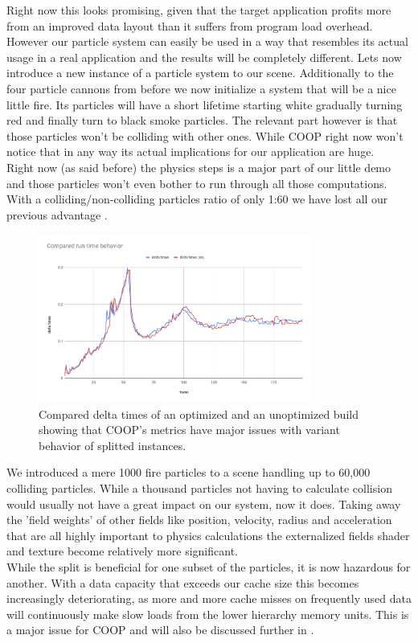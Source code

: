 Right now this looks promising, given that the target application profits more from an improved data layout than it suffers from program load overhead. However our particle system can easily be used in a way that resembles its actual usage in a real application and the results will be completely different. Lets now introduce a new instance of a particle system to our scene. Additionally to the four particle cannons from before we now initialize a system that will be a nice little fire. Its particles will have a short lifetime starting white gradually turning red and finally turn to black smoke particles. The relevant part however is that those particles won't be colliding with other ones. While COOP right now won't notice that in any way its actual implications for our application are huge.\\
Right now (as said before) the physics steps is a major part of our little demo and those particles won't even bother to run through all those computations. With a colliding/non-colliding particles ratio of only 1:60 we have lost all our previous advantage .
\begin{figure}[!htbp]
	\centering
	\includegraphics[width=0.8\textwidth,height=0.6\textwidth]{PICs/delta_times_fire}
	\caption{Compared delta times of an optimized and an unoptimized build showing that COOP's metrics have major issues with variant behavior of splitted instances.}
	\label{delta_times_fire}
\end{figure}
We introduced a mere 1000 fire particles to a scene handling up to 60,000 colliding particles. While a thousand particles not having to calculate collision would usually not have a great impact on our system, now it does. Taking away the 'field weights' of other fields like position, velocity, radius and acceleration that are all highly important to physics calculations the externalized fields shader and texture become relatively more significant.\\
While the split is beneficial for one subset of the particles, it is now hazardous for another. With a data capacity that exceeds our cache size this becomes increasingly deteriorating, as more and more cache misses on frequently used data will continuously make slow loads from the lower hierarchy memory units. This is a major issue for COOP and will also be discussed further in .






